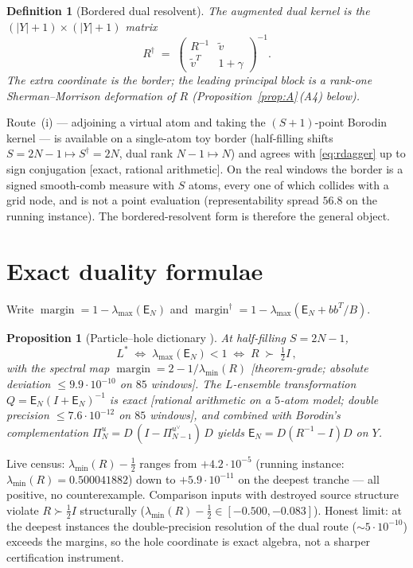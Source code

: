 \documentclass[11pt]{article}
\newtheorem{definition}{Definition}
\newtheorem{prop}{Proposition}
\theoremstyle{remark}
\newcommand{\E}{\mathsf{E}}
\newcommand{\Rd}{R^{\dagger}}
\newcommand{\Ls}{L^{*}}
\newcommand{\half}{\tfrac12}
\newcommand{\gr}[1]{\textnormal{\small[#1]}}
\begin{document}
\begin{definition}[Bordered dual resolvent]\label{def:rdagger}
The \emph{augmented dual kernel} is the $(|Y|+1)\times(|Y|+1)$ matrix
\begin{equation}\label{eq:rdagger}
\Rd
\;=\;
\begin{pmatrix}
R^{-1} & \widetilde v \\
\widetilde v^{T} & 1+\gamma
\end{pmatrix}^{-1}.
\end{equation}
The extra coordinate is the border; the leading principal block is a
rank-one Sherman--Morrison deformation of $R$
(Proposition~\ref{prop:A}\,(A4) below).
\end{definition}

Route~(i) --- adjoining a virtual atom and taking the
$(S+1)$-point Borodin kernel --- is available on a single-atom toy
border (half-filling shifts $S=2N-1\mapsto S^{\dagger}=2N$, dual rank
$N-1\mapsto N$) and agrees with \eqref{eq:rdagger} up to sign
conjugation \gr{exact, rational arithmetic}.  On the real windows the
border is a signed smooth-comb measure with $S$ atoms, every one of
which collides with a grid node, and is not a point evaluation
(representability spread $56.8$ on the running instance).  The
bordered-resolvent form is therefore the general object.

\section{Exact duality formulae}\label{sec:duality}

Write $\operatorname{margin}=1-\lambda_{\max}(\E_{N})$ and
$\operatorname{margin}^{\dagger}=1-\lambda_{\max}(\E_{N}+bb^{T}/B)$.

\begin{prop}[Particle--hole dictionary \cite{Borodin2002}]\label{prop:borodin}
At half-filling $S=2N-1$,
\[
\Ls
\;\iff\;
\lambda_{\max}(\E_{N})<1
\;\iff\;
R\;\succ\;\half I\,,
\]
with the spectral map
$\operatorname{margin}=2-1/\lambda_{\min}(R)$
\gr{theorem-grade; absolute deviation $\le 9.9\cdot10^{-10}$ on
$85$ windows}.  The $L$-ensemble transformation
$Q=\E_{N}(I+\E_{N})^{-1}$ is exact
\gr{rational arithmetic on a $5$-atom model; double precision
$\le 7.6\cdot10^{-12}$ on $85$ windows}, and combined with Borodin's
complementation $\Pi_{N}^{u}=D\,(I-\Pi_{N-1}^{u^{\vee}})\,D$ yields
$\E_{N}=D(R^{-1}-I)D$ on $Y$.
\end{prop}

Live census: $\lambda_{\min}(R)-\half$ ranges from $+4.2\cdot10^{-5}$
(running instance: $\lambda_{\min}(R)=0.500041882$) down to
$+5.9\cdot10^{-11}$ on the deepest tranche --- all positive, no
counterexample.  Comparison inputs with destroyed source structure
violate $R\succ\half I$ structurally
($\lambda_{\min}(R)-\half\in[-0.500,-0.083]$).  Honest limit: at the
deepest instances the double-precision resolution of the dual route
($\sim5\cdot10^{-10}$) exceeds the margins, so the hole coordinate is
exact algebra, not a sharper certification instrument.
\end{document}
